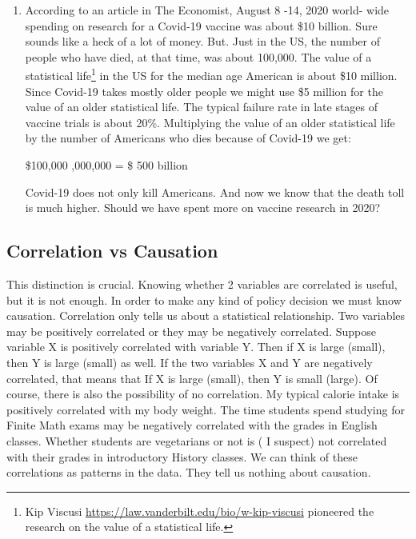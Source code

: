 \documentclass[
]{book}
\begin{document}
\begin{enumerate}
\def\labelenumi{\arabic{enumi}.}
\setcounter{enumi}{2}
\item
  According to an article in The Economist, August 8 -14, 2020 world- wide spending on research for a Covid-19 vaccine was about \$10 billion. Sure sounds like a heck of a lot of money. But. Just in the US, the number of people who have died, at that time, was about 100,000. The value of a statistical life\footnote{Kip Viscusi \url{https://law.vanderbilt.edu/bio/w-kip-viscusi} pioneered the research on the value of a statistical life.} in the US for the median age American is about \$10 million. Since Covid-19 takes mostly older people we might use \$5 million for the value of an older statistical life. The typical failure rate in late stages of vaccine trials is about 20\%. Multiplying the value of an older statistical life by the number of Americans who dies because of Covid-19 we get:

  \$100,000  ,000,000 = \$ 500 billion

  Covid-19 does not only kill Americans. And now we know that the death toll is much higher. Should we have spent more on vaccine research in 2020?
\end{enumerate}

\hypertarget{correlation-vs-causation}{%
\subsection{Correlation vs Causation}\label{correlation-vs-causation}}

This distinction is crucial. Knowing whether 2 variables are correlated is useful, but it is not enough. In order to make any kind of policy decision we must know causation. Correlation only tells us about a statistical relationship. Two variables may be positively correlated or they may be negatively correlated. Suppose variable X is positively correlated with variable Y. Then if X is large (small), then Y is large (small) as well. If the two variables X and Y are negatively correlated, that means that If X is large (small), then Y is small (large). Of course, there is also the possibility of no correlation.
My typical calorie intake is positively correlated with my body weight.
The time students spend studying for Finite Math exams may be negatively correlated with the grades in English classes.
Whether students are vegetarians or not is ( I suspect) not correlated with their grades in introductory History classes.
We can think of these correlations as patterns in the data. They tell us nothing about causation.
\end{document}

